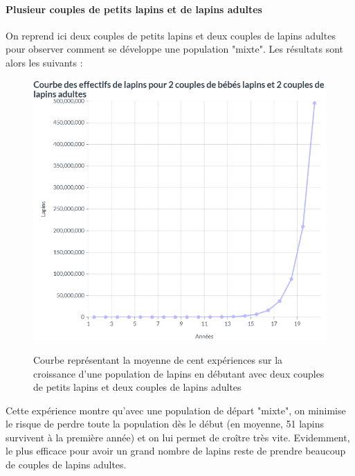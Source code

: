 \documentclass[12pt]{article}
\begin{document}
    \paragraph{Plusieur couples de petits lapins et de lapins adultes}\hspace{0.5cm}
    \newline
    \par On reprend ici deux couples de petits lapins et deux couples de lapins adultes pour observer comment se développe une population "mixte". Les résultats sont alors les suivants :
    \newpage
    \begin{figure}[!h]
	    \centering
	    \caption{Courbe représentant la moyenne de cent expériences sur la croissance d'une population de lapins en débutant avec deux couples de petits lapins et deux couples de lapins adultes}
        \includegraphics[scale = 0.8]{Photos/courbe2_2.png}
	    \label{fig12}
	\end{figure}
    \par
    Cette expérience montre qu'avec une population de départ "mixte", on minimise le risque de perdre toute la population dès le début (en moyenne, 51 lapins survivent à la première année) et on lui permet de croître très vite. Evidemment, le plus efficace pour avoir un grand nombre de lapins reste de prendre beaucoup de couples de lapins adultes.
    \newpage
\end{document}

